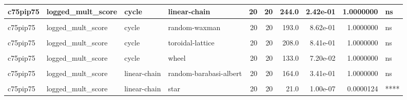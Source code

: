\documentclass[
]{book}
\begin{document}
\begin{table}
\begin{tabular}{l|l|l|l|r|r|r|r|r|l}
\hline
c75pip75 & logged\_mult\_score & cycle & linear-chain & 20 & 20 & 244.0 & 2.42e-01 & 1.0000000 & ns\\
\hline
\cellcolor{gray!6}{c75pip75} & \cellcolor{gray!6}{logged\_mult\_score} & \cellcolor{gray!6}{cycle} & \cellcolor{gray!6}{random-barabasi-albert} & \cellcolor{gray!6}{20} & \cellcolor{gray!6}{20} & \cellcolor{gray!6}{204.0} & \cellcolor{gray!6}{9.25e-01} & \cellcolor{gray!6}{1.0000000} & \cellcolor{gray!6}{ns}\\
\hline
c75pip75 & logged\_mult\_score & cycle & random-waxman & 20 & 20 & 193.0 & 8.62e-01 & 1.0000000 & ns\\
\hline
\cellcolor{gray!6}{c75pip75} & \cellcolor{gray!6}{logged\_mult\_score} & \cellcolor{gray!6}{cycle} & \cellcolor{gray!6}{star} & \cellcolor{gray!6}{20} & \cellcolor{gray!6}{20} & \cellcolor{gray!6}{44.0} & \cellcolor{gray!6}{5.80e-06} & \cellcolor{gray!6}{0.0010727} & \cellcolor{gray!6}{**}\\
\hline
c75pip75 & logged\_mult\_score & cycle & toroidal-lattice & 20 & 20 & 208.0 & 8.41e-01 & 1.0000000 & ns\\
\hline
\cellcolor{gray!6}{c75pip75} & \cellcolor{gray!6}{logged\_mult\_score} & \cellcolor{gray!6}{cycle} & \cellcolor{gray!6}{well-mixed} & \cellcolor{gray!6}{20} & \cellcolor{gray!6}{20} & \cellcolor{gray!6}{133.0} & \cellcolor{gray!6}{7.20e-02} & \cellcolor{gray!6}{1.0000000} & \cellcolor{gray!6}{ns}\\
\hline
c75pip75 & logged\_mult\_score & cycle & wheel & 20 & 20 & 133.0 & 7.20e-02 & 1.0000000 & ns\\
\hline
\cellcolor{gray!6}{c75pip75} & \cellcolor{gray!6}{logged\_mult\_score} & \cellcolor{gray!6}{cycle} & \cellcolor{gray!6}{windmill} & \cellcolor{gray!6}{20} & \cellcolor{gray!6}{20} & \cellcolor{gray!6}{185.0} & \cellcolor{gray!6}{6.98e-01} & \cellcolor{gray!6}{1.0000000} & \cellcolor{gray!6}{ns}\\
\hline
c75pip75 & logged\_mult\_score & linear-chain & random-barabasi-albert & 20 & 20 & 164.0 & 3.41e-01 & 1.0000000 & ns\\
\hline
\cellcolor{gray!6}{c75pip75} & \cellcolor{gray!6}{logged\_mult\_score} & \cellcolor{gray!6}{linear-chain} & \cellcolor{gray!6}{random-waxman} & \cellcolor{gray!6}{20} & \cellcolor{gray!6}{20} & \cellcolor{gray!6}{140.0} & \cellcolor{gray!6}{1.08e-01} & \cellcolor{gray!6}{1.0000000} & \cellcolor{gray!6}{ns}\\
\hline
c75pip75 & logged\_mult\_score & linear-chain & star & 20 & 20 & 21.0 & 1.00e-07 & 0.0000124 & ****\\

\end{tabular}
\end{table}
\end{document}
